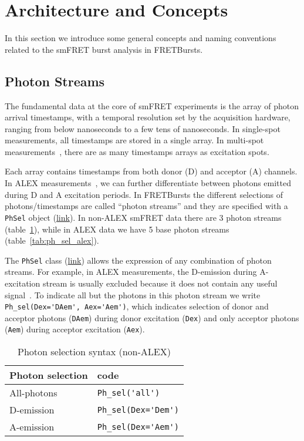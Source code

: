 \section{Architecture and Concepts}
\label{sec:concepts}

In this section we introduce some general concepts and naming conventions related
to the smFRET burst analysis in FRETBursts.

\subsection{Photon Streams}
\label{sec:ph_streams}

The fundamental data at the core of smFRET experiments is the array of photon
arrival timestamps, with a temporal resolution set by the acquisition hardware,
ranging from below nanoseconds to a few tens of nanoseconds.
In single-spot
measurements, all timestamps are stored in a single array. In multi-spot
measurements~\cite{Ingargiola_2013}, there are as many timestamps arrays
as excitation spots.

Each array contains timestamps from both donor (D) and acceptor (A) channels.
In ALEX measurements~\cite{Lee_2005}, we can further differentiate between
photons emitted during D and A excitation periods. In FRETBursts the different
selections of photons/timestamps are called ``photon streams'' and they are
specified with a \verb|PhSel| object 
(\href{http://fretbursts.readthedocs.org/en/latest/ph_sel.html}{link}). 
In non-ALEX smFRET data there are 3 photon streams
(table~\ref{tab:ph_sel_smfret}), while in ALEX data we have 5 base photon
streams (table~\ref{tab:ph_sel_alex}).

The \verb|PhSel| class (\href{http://fretbursts.readthedocs.org/en/latest/ph_sel.html}{link})
allows the expression of any combination of photon streams.
For example, in ALEX measurements, the D-emission during A-excitation stream is
usually excluded because it does not contain any useful signal~\cite{Lee_2005}.
To indicate all but the photons in this photon stream we write
\verb|Ph_sel(Dex='DAem', Aex='Aem')|, which indicates selection of donor
and acceptor photons (\verb|DAem|) during donor excitation (\verb|Dex|) and only acceptor
photons (\verb|Aem|) during acceptor excitation (\verb|Aex|).

\begin{table}
\begin{tabular}{l|l}
  Photon selection  & code \\
  \hline
  All-photons       & \verb|Ph_sel('all')|\\
  D-emission    & \verb|Ph_sel(Dex='Dem')|\\
  A-emission & \verb|Ph_sel(Dex='Aem')|\\
\end{tabular}
\caption{\label{tab:ph_sel_smfret}Photon selection syntax (non-ALEX)}
\end{table}

